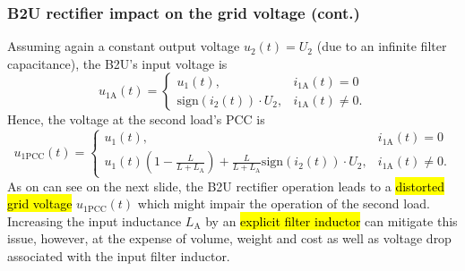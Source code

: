 \begin{frame}
    \frametitle{B2U rectifier impact on the grid voltage (cont.)}
    Assuming again a constant output voltage $u_2(t)=U_2$ (due to an infinite filter capacitance), the B2U's input voltage is
    \begin{equation}
        u_{1\mathrm{A}}(t) = \begin{cases} u_{1}(t), &i_{1\mathrm{A}}(t)=0\\ \mathrm{sign}(i_2(t))\cdot U_2, &i_{1\mathrm{A}}(t) \neq 0.
        \end{cases}
    \end{equation}\pause
    Hence, the voltage at the second load's PCC is
    \begin{equation}
        u_{1\mathrm{PCC}}(t) = \begin{cases} u_1(t), & i_{1\mathrm{A}}(t)=0\\  u_1(t)\left(1-\frac{L}{L+L_\mathrm{A}}\right) + \frac{L}{L+L_\mathrm{A}}\mathrm{sign}(i_2(t))\cdot U_2, & i_{1\mathrm{A}}(t) \neq 0. \end{cases}
    \end{equation}\pause
    As on can see on the next slide, the B2U rectifier operation leads to a \hl{distorted grid voltage} $u_{1\mathrm{PCC}}(t)$ which might impair the operation of the second load. Increasing the input inductance $L_\mathrm{A}$ by an \hl{explicit filter inductor} can mitigate this issue, however, at the expense of volume, weight and cost as well as voltage drop associated with the input filter inductor.
\end{frame}

